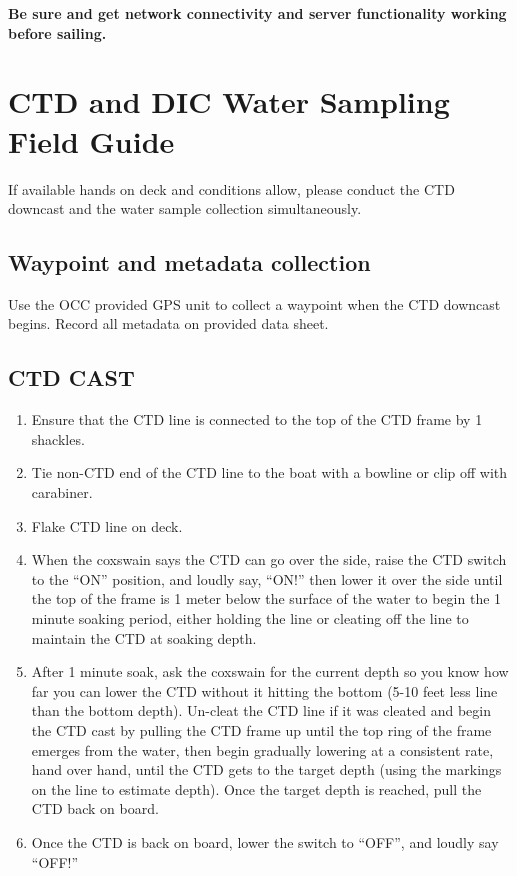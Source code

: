 \documentclass[
]{book}
\providecommand{\tightlist}{%
  \setlength{\itemsep}{0pt}\setlength{\parskip}{0pt}}
\begin{document}
\textbf{Be sure and get network connectivity and server functionality working before sailing.}

\hypertarget{water}{%
\chapter{CTD and DIC Water Sampling Field Guide}\label{water}}

If available hands on deck and conditions allow, please conduct the CTD downcast and the water sample collection simultaneously.

\hypertarget{waypoint-and-metadata-collection}{%
\section{Waypoint and metadata collection}\label{waypoint-and-metadata-collection}}

Use the OCC provided GPS unit to collect a waypoint when the CTD downcast begins. Record all metadata on provided data sheet.

\hypertarget{ctd-cast}{%
\section{CTD CAST}\label{ctd-cast}}

\begin{enumerate}
\def\labelenumi{\arabic{enumi}.}
\tightlist
\item
  Ensure that the CTD line is connected to the top of the CTD frame by 1 shackles.
\item
  Tie non-CTD end of the CTD line to the boat with a bowline or clip off with carabiner.
\item
  Flake CTD line on deck.
\item
  When the coxswain says the CTD can go over the side, raise the CTD switch to the ``ON'' position, and loudly say, ``ON!'' then lower it over the side until the top of the frame is 1 meter below the surface of the water to begin the 1 minute soaking period, either holding the line or cleating off the line to maintain the CTD at soaking depth.
\item
  After 1 minute soak, ask the coxswain for the current depth so you know how far you can lower the CTD without it hitting the bottom (5-10 feet less line than the bottom depth). Un-cleat the CTD line if it was cleated and begin the CTD cast by pulling the CTD frame up until the top ring of the frame emerges from the water, then begin gradually lowering at a consistent rate, hand over hand, until the CTD gets to the target depth (using the markings on the line to estimate depth). Once the target depth is reached, pull the CTD back on board.
\item
  Once the CTD is back on board, lower the switch to ``OFF'', and loudly say ``OFF!''
\end{enumerate}
\end{document}
